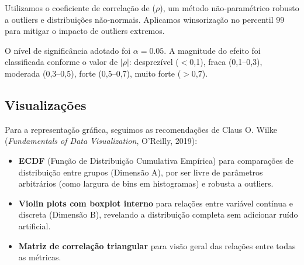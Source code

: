 Utilizamos o coeficiente de correlação de \spearman ($\rho$), um método
não-paramétrico robusto a outliers e distribuições não-normais.
Aplicamos winsorização no percentil 99 para mitigar o impacto de outliers extremos.

O nível de significância adotado foi $\alpha = 0.05$. A magnitude do efeito
foi classificada conforme o valor de $|\rho|$:
desprezível ($<$0,1), fraca (0,1--0,3), moderada (0,3--0,5), forte (0,5--0,7),
muito forte ($>$0,7).

\subsection{Visualizações}

Para a representação gráfica, seguimos as recomendações de Claus O. Wilke
(\textit{Fundamentals of Data Visualization}, O'Reilly, 2019):
\begin{itemize}
    \item \textbf{ECDF} (Função de Distribuição Cumulativa Empírica) para comparações
    de distribuição entre grupos (Dimensão A), por ser livre de parâmetros arbitrários
    (como largura de bins em histogramas) e robusta a outliers.
    \item \textbf{Violin plots com boxplot interno} para relações entre variável contínua
    e discreta (Dimensão B), revelando a distribuição completa sem adicionar ruído artificial.
    \item \textbf{Matriz de correlação triangular} para visão geral das relações
    entre todas as métricas.
\end{itemize}

